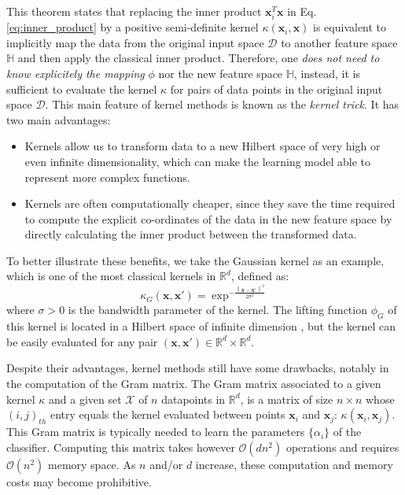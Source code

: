 This theorem states that replacing the inner product $\mathbf{x}_i^T\mathbf{x}$ in Eq. \ref{eq:inner_product} by a positive semi-definite kernel $\kappa(\mathbf{x}_i,\mathbf{x})$ is equivalent to implicitly map the data from the original input space $\mathcal{D}$ to another feature space $\mathbb{H}$ and then apply the classical inner product. Therefore, one \emph{does not need to know explicitely the mapping} $\phi$ nor the new feature space $\mathbb{H}$, instead, it is sufficient to evaluate the kernel $\kappa$ for pairs of data points in the original input space $\mathcal{D}$. This main feature of kernel methods is known as the \emph{kernel trick}. It has two main advantages:
\begin{itemize}
    \item Kernels allow us to transform data to a new Hilbert space of very high or even infinite dimensionality, which can make the learning model able to represent more complex functions.
    \item Kernels are often computationally cheaper, since they save the time required to compute the explicit co-ordinates of the data in the new feature space by directly calculating the inner product between the transformed data.
\end{itemize}
To better illustrate these benefits, we take the Gaussian kernel as an example, which is one of the most classical kernels in $\mathbb{R}^d$, defined as:
\begin{equation}
\label{eq:Guassian_kernel}
    \kappa_{G}(\mathbf{x},\mathbf{x}')=\exp^{-\frac{\left \| \mathbf{x}-\mathbf{x}'\right\|^2}{2\sigma^2}}
\end{equation}
where $\sigma>0$ is the bandwidth parameter of the kernel. The lifting function $\phi_G$ of this kernel is located in a Hilbert space of infinite dimension , but the kernel can be easily evaluated for any pair $(\mathbf{x},\mathbf{x}')\in\mathbb{R}^d\times \mathbb{R}^d$.

Despite their advantages, kernel methods still have some drawbacks, notably in the computation of the Gram matrix. The Gram matrix associated to a given kernel $\kappa$ and a given set $\mathcal{X}$ of $n$ datapoints in $\mathbb{R}^d$, is a matrix of size $n\times n$ whose $(i,j)_{th}$ entry equals the kernel evaluated between points $\mathbf{x}_i$ and $\mathbf{x}_j$: $\kappa(\mathbf{x}_i, \mathbf{x}_j)$. This Gram matrix is typically needed to learn the parameters $\{\alpha_i\}$ of the classifier. Computing this matrix takes however $\mathcal{O}(dn^2)$ operations and requires $\mathcal{O}(n^2)$ memory space. As $n$ and/or $d$ increase, these computation and memory costs may become prohibitive. 

